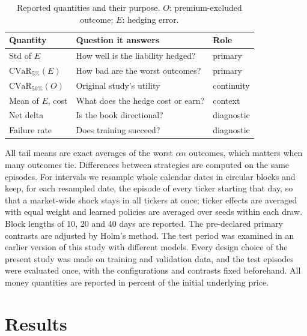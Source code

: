 \documentclass[10pt,conference]{IEEEtran}
\begin{document}
\begin{table}[t]
\caption{Reported quantities and their purpose. $O$: premium-excluded
outcome; $E$: hedging error.}
\label{tab:metrics}
\centering
\footnotesize
\begin{tabular}{@{}p{}p{}p{}@{}}
\toprule
Quantity & Question it answers & Role \\
\midrule
Std of $E$ & How well is the liability hedged? & primary \\
$\mathrm{CVaR}_{5\%}(E)$ & How bad are the worst outcomes? & primary \\
$\mathrm{CVaR}_{50\%}(O)$ & Original study's utility & continuity \\
Mean of $E$, cost & What does the hedge cost or earn? & context \\
Net delta & Is the book directional? & diagnostic \\
Failure rate & Does training succeed? & diagnostic \\
\bottomrule
\end{tabular}
\end{table}

All tail means are exact averages of the worst $\alpha n$ outcomes, which
matters when many outcomes tie. Differences between strategies are computed
on the same episodes. For intervals we resample whole calendar dates in
circular blocks \cite{politis1992,lahiri2003resampling} and keep, for each
resampled date, the episode of every ticker starting that day, so that a
market-wide shock stays in all tickers at once; ticker effects are averaged
with equal weight and learned policies are averaged over seeds within each
draw. Block lengths of 10, 20 and 40 days are reported. The pre-declared
primary contrasts are adjusted by Holm's method.
The test period was examined in an earlier version of this study with
different models. Every design choice of the present study was made on
training and validation data, and the test episodes were evaluated once,
with the configurations and contrasts fixed beforehand. All money quantities
are reported in percent of the initial underlying price.

\section{Results}
\end{document}
